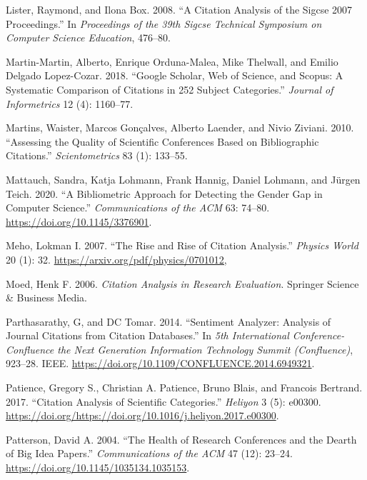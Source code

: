 \documentclass{article}
\begin{document}
\leavevmode\hypertarget{ref-lister08:citation}{}%
Lister, Raymond, and Ilona Box. 2008. ``A Citation Analysis of the Sigcse 2007 Proceedings.'' In \emph{Proceedings of the 39th Sigcse Technical Symposium on Computer Science Education}, 476--80.

\leavevmode\hypertarget{ref-martin18:google}{}%
Martin-Martin, Alberto, Enrique Orduna-Malea, Mike Thelwall, and Emilio Delgado Lopez-Cozar. 2018. ``Google Scholar, Web of Science, and Scopus: A Systematic Comparison of Citations in 252 Subject Categories.'' \emph{Journal of Informetrics} 12 (4): 1160--77.

\leavevmode\hypertarget{ref-martins10:assessing}{}%
Martins, Waister, Marcos Gonçalves, Alberto Laender, and Nivio Ziviani. 2010. ``Assessing the Quality of Scientific Conferences Based on Bibliographic Citations.'' \emph{Scientometrics} 83 (1): 133--55.

\leavevmode\hypertarget{ref-mattauch20:bibliometric}{}%
Mattauch, Sandra, Katja Lohmann, Frank Hannig, Daniel Lohmann, and Jürgen Teich. 2020. ``A Bibliometric Approach for Detecting the Gender Gap in Computer Science.'' \emph{Communications of the ACM} 63: 74--80. \url{https://doi.org/10.1145/3376901}.

\leavevmode\hypertarget{ref-meho07:rise}{}%
Meho, Lokman I. 2007. ``The Rise and Rise of Citation Analysis.'' \emph{Physics World} 20 (1): 32. \url{https://arxiv.org/pdf/physics/0701012,}

\leavevmode\hypertarget{ref-moed06:citation}{}%
Moed, Henk F. 2006. \emph{Citation Analysis in Research Evaluation}. Springer Science \& Business Media.

\leavevmode\hypertarget{ref-parthasarathy14:sentiment}{}%
Parthasarathy, G, and DC Tomar. 2014. ``Sentiment Analyzer: Analysis of Journal Citations from Citation Databases.'' In \emph{5th International Conference-Confluence the Next Generation Information Technology Summit (Confluence)}, 923--28. IEEE. \url{https://doi.org/10.1109/CONFLUENCE.2014.6949321}.

\leavevmode\hypertarget{ref-patience17:citation}{}%
Patience, Gregory S., Christian A. Patience, Bruno Blais, and Francois Bertrand. 2017. ``Citation Analysis of Scientific Categories.'' \emph{Heliyon} 3 (5): e00300. \url{https://doi.org/https://doi.org/10.1016/j.heliyon.2017.e00300}.

\leavevmode\hypertarget{ref-patterson04:health}{}%
Patterson, David A. 2004. ``The Health of Research Conferences and the Dearth of Big Idea Papers.'' \emph{Communications of the ACM} 47 (12): 23--24. \url{https://doi.org/10.1145/1035134.1035153}.
\end{document}
